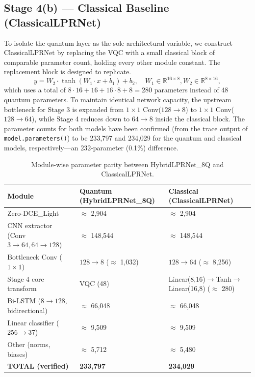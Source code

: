 \documentclass{ieeeaccess}
\begin{document}
\subsection{Stage 4(b) — Classical Baseline (ClassicalLPRNet)}
To isolate the quantum layer as the sole architectural variable, we construct ClassicalLPRNet by replacing the VQC with a small classical block of comparable parameter count, holding every other module constant. The replacement block is designed to replicate.
\begin{equation}
y = W_2 \cdot \tanh(W_1 \cdot x + b_1) + b_2, \quad W_1 \in \mathbb{R}^{16\times 8}, W_2 \in \mathbb{R}^{8\times 16},
\end{equation}
which uses a total of $8 \cdot 16 + 16 + 16 \cdot 8 + 8 = 280$ parameters instead of 48 quantum parameters. To maintain identical network capacity, the upstream bottleneck for Stage 3 is expanded from $1 \times 1$ Conv($128 \rightarrow 8$) to $1 \times 1$ Conv($128 \rightarrow 64$), while Stage 4 reduces down to $64 \rightarrow 8$ inside the classical block. The parameter counts for both models have been confirmed (from the trace output of \texttt{model.parameters()}) to be 233,797 and 234,029 for the quantum and classical models, respectively---an 232-parameter (0.1\%) difference.

\begin{table}[h]
\centering
\caption{Module-wise parameter parity between HybridLPRNet\_8Q and ClassicalLPRNet.}
\label{tab:params}
\begin{tabularx}{\columnwidth}{@{}lXX@{}}
\toprule
\textbf{Module} & \textbf{Quantum (HybridLPRNet\_8Q)} & \textbf{Classical (ClassicalLPRNet)} \\
\midrule
Zero-DCE\_Light & $\approx$ 2,904 & $\approx$ 2,904 \\
CNN extractor (Conv $3\rightarrow 64, 64\rightarrow 128$) & $\approx$ 148,544 & $\approx$ 148,544 \\
Bottleneck Conv ($1\times 1$) & $128\rightarrow 8$ ($\approx$ 1,032) & $128\rightarrow 64$ ($\approx$ 8,256) \\
Stage 4 core transform & VQC (48) & Linear(8,16)$\rightarrow$Tanh$\rightarrow$Linear(16,8) ($\approx$ 280) \\
Bi-LSTM ($8 \rightarrow 128$, bidirectional) & $\approx$ 66,048 & $\approx$ 66,048 \\
Linear classifier ($256 \rightarrow 37$) & $\approx$ 9,509 & $\approx$ 9,509 \\
Other (norms, biases) & $\approx$ 5,712 & $\approx$ 5,480 \\
\textbf{TOTAL (verified)} & \textbf{233,797} & \textbf{234,029} \\
\bottomrule
\end{tabularx}
\end{table}
\end{document}
